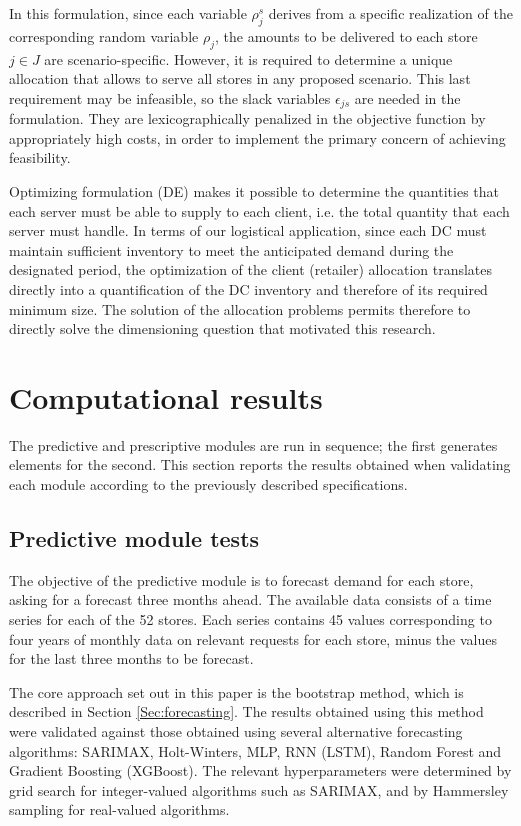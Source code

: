 \documentclass[preprint,11pt,authoryear]{elsarticle}
\begin{document}
In this formulation, since each variable $\rho_j^s$ derives from a specific realization of the corresponding random variable $\rho_j$, the amounts to be delivered to each store $j \in J$ are scenario-specific. However, it is required to determine a unique allocation that allows to serve all stores in any proposed scenario. This last requirement may be infeasible, so the slack variables $\epsilon_{js}$ are needed in the formulation. They are lexicographically penalized in the objective function by appropriately high costs, in order to implement the primary concern of achieving feasibility.

Optimizing formulation (DE) makes it possible to determine the quantities that each server must be able to supply to each client, i.e. the total quantity that each server must handle. 
In terms of our logistical application, since each DC must maintain sufficient inventory to meet the anticipated demand during the designated period, the optimization of the client (retailer) allocation translates directly into a quantification of the DC inventory and therefore of its required minimum size. The solution of the allocation problems permits therefore to directly solve the dimensioning question that motivated this research.

\section{Computational results} \label{Sec:results}

The predictive and prescriptive modules are run in sequence; the first generates elements for the second. This section reports the results obtained when validating each module according to the previously described specifications.

\subsection{Predictive module tests} \label{Subsec:predictive}

The objective of the predictive module is to forecast demand for each store, asking for a forecast three months ahead.
The available data consists of a time series for each of the 52 stores. Each series contains 45 values corresponding to four years of monthly data on relevant requests for each store, minus the values for the last three months to be forecast.

The core approach set out in this paper is the bootstrap method, which is described in Section \ref{Sec:forecasting}. The results obtained using this method were validated against those obtained using several alternative forecasting algorithms: SARIMAX, Holt-Winters, MLP, RNN (LSTM), Random Forest and Gradient Boosting (XGBoost). The relevant hyperparameters were determined by grid search for integer-valued algorithms such as SARIMAX, and by Hammersley sampling \citep{H60} for real-valued algorithms.
\end{document}

